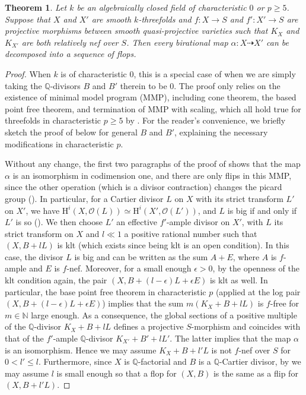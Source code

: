\documentclass[11pt, letterpaper]{amsart}
\theoremstyle{plain}
\newtheorem{theorem}{Theorem}[section]
\theoremstyle{definition}
\newcommand{\IQ}{\mathbb{Q}}
\newcommand{\<}{\langle}
\renewcommand{\>}{\rangle}
\newcommand{\sO}{\mathcal{O}}
\begin{document}
\begin{theorem}
\label{prop: connected by flops}
    Let $k$ be an algebraically closed field of characteristic $0$ or $p \ge 5$.
    Suppose that $X$ and $X'$ are smooth $k$-threefolds and $f : X \to S$ and $f' : X' \to S$ are projective morphisms between smooth quasi-projective varieties such that $K_X$ and $K_{X'}$ are both relatively nef over $S$. Then every birational map $\alpha : X \dashrightarrow X'$ can be decomposed into a sequence of flops. 
\end{theorem}
\begin{proof}
	When $k$ is of characteristic $0$, this is a special case of \cite[Thm.~1]{Kawamata} when we are simply taking the $\IQ$-divisors $B$ and $B'$ therein to be $0$. 
	The proof only relies on the existence of minimal model program (MMP), including cone theorem, the based point free theorem, and termination of MMP with scaling, which all hold true for threefolds in characteristic $p \ge 5$  by \cite{HX-MMP, HW-MMP}.
	For the reader's convenience, we briefly sketch the proof of \cite{Kawamata} below for general $B$ and $B'$, explaining the necessary modifications in characteristic $p$.
	
	
	Without any change, the first two paragraphs of the proof of \cite[Thm.~1]{Kawamata} shows that the map $\alpha$ is an isomorphism in codimension one, and there are only flips in this MMP, since the other operation (which is a divisor contraction) changes the picard group (\cite[\S 3.31]{KM98}).
	In particular, for a Cartier divisor $L$ on $X$ with its strict transform $L'$ on $X'$, we have $\mathrm{H}^i(X,\sO(L))\simeq \mathrm{H}^i(X',\sO(L'))$, and $L$ is big if and only if $L'$ is so (\cite[Def.~2.59]{KM98}).
	We then choose $L'$ an effective $f'$-ample divisor on $X'$, with $L$ its strict transform on $X$ and $l\ll 1$ a positive rational number such that $(X,B+lL)$ is klt (which exists since being klt is an open condition).
	In this case, the divisor $L$ is big and can be written as the sum $A+E$, where $A$ is $f$-ample and $E$ is $f$-nef.
	Moreover, for a small enough $\epsilon >0$, by the openness of the klt condition again, the pair $(X, B+ (l-\epsilon) L +\epsilon E)$ is klt as well.
	In particular, the base point free theorem in characteristic $p$ \cite[Cor.~1.5]{ABL22} (applied at the log pair $(X, B+(l-\epsilon)L+\epsilon E)$) implies that the sum $m(K_X+B+lL)$ is $f$-free for $m\in \mathbb{N}$ large enough.
	As a consequence, the global sections of a positive multiple of the $\mathbb{Q}$-divisor $K_X+B+lL$ defines a projective $S$-morphism and coincides with that of the $f'$-ample $\mathbb{Q}$-divisor $K_{X'}+B'+lL'$.
 The latter implies that the map $\alpha$ is an isomorphism.
	Hence we may assume $K_X+B+l'L$ is not $f$-nef over $S$ for $0<l' \leq l$.
  Furthermore, since $X$ is $\mathbb{Q}$-factorial and $B$ is a $\mathbb{Q}$-Cartier divisor, by \cite[Def.~6.10]{KM98} we may assume $l$ is small enough so that a flop for $(X,B)$ is the same as a flip for $(X,B+l'L)$.
 

\end{proof}
\end{document}
